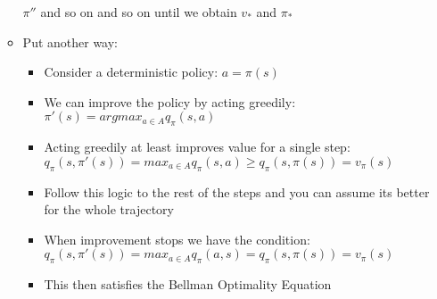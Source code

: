 \documentclass[12pt]{article}
\begin{document}
\begin{itemize}
\begin{itemize}
      $\pi''$ and so on and so on until we obtain $v_*$ and $\pi_*$
      \item Put another way:
      \begin{itemize}
        \item Consider a deterministic policy: $a = \pi(s)$
        \item We can improve the policy by acting greedily: $\pi'(s) = argmax_{a \in A}q_\pi(s, a)$
        \item Acting greedily at least improves value for a single step: 
        $q_\pi(s, \pi'(s)) = max_{a \in A}q_\pi(s,a) \ge q_\pi(s, \pi(s)) = v_\pi(s)$
        \item Follow this logic to the rest of the steps and you can assume its better for the whole trajectory
        \item When improvement stops we have the condition: \\
        $q_\pi(s,\pi'(s)) = max_{a \in A}q_\pi(a, s) = q_\pi(s, \pi(s)) = v_\pi(s)$
        \item This then satisfies the Bellman Optimality Equation
      \end{itemize}
    \end{itemize}
  \end{itemize}
\end{document}
